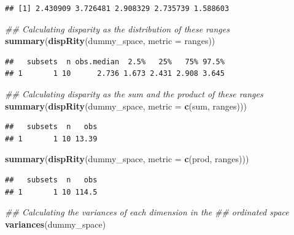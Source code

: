 \documentclass[]{book}
\newenvironment{Shaded}{\begin{snugshade}}{\end{snugshade}}
\newcommand{\CommentTok}[1]{\textcolor[rgb]{0.56,0.35,0.01}{\textit{#1}}}
\newcommand{\DataTypeTok}[1]{\textcolor[rgb]{0.13,0.29,0.53}{#1}}
\newcommand{\KeywordTok}[1]{\textcolor[rgb]{0.13,0.29,0.53}{\textbf{#1}}}
\newcommand{\NormalTok}[1]{#1}
\begin{document}
\begin{verbatim}
## [1] 2.430909 3.726481 2.908329 2.735739 1.588603
\end{verbatim}

\begin{Shaded}
\begin{Highlighting}[]
\CommentTok{## Calculating disparity as the distribution of these ranges}
\KeywordTok{summary}\NormalTok{(}\KeywordTok{dispRity}\NormalTok{(dummy_space, }\DataTypeTok{metric =}\NormalTok{ ranges))}
\end{Highlighting}
\end{Shaded}

\begin{verbatim}
##   subsets  n obs.median  2.5%   25%   75% 97.5%
## 1       1 10      2.736 1.673 2.431 2.908 3.645
\end{verbatim}

\begin{Shaded}
\begin{Highlighting}[]
\CommentTok{## Calculating disparity as the sum and the product of these ranges}
\KeywordTok{summary}\NormalTok{(}\KeywordTok{dispRity}\NormalTok{(dummy_space, }\DataTypeTok{metric =} \KeywordTok{c}\NormalTok{(sum, ranges)))}
\end{Highlighting}
\end{Shaded}

\begin{verbatim}
##   subsets  n   obs
## 1       1 10 13.39
\end{verbatim}

\begin{Shaded}
\begin{Highlighting}[]
\KeywordTok{summary}\NormalTok{(}\KeywordTok{dispRity}\NormalTok{(dummy_space, }\DataTypeTok{metric =} \KeywordTok{c}\NormalTok{(prod, ranges)))}
\end{Highlighting}
\end{Shaded}

\begin{verbatim}
##   subsets  n   obs
## 1       1 10 114.5
\end{verbatim}

\begin{Shaded}
\begin{Highlighting}[]
\CommentTok{## Calculating the variances of each dimension in the}
\CommentTok{## ordinated space}
\KeywordTok{variances}\NormalTok{(dummy_space)}
\end{Highlighting}
\end{Shaded}
\end{document}
